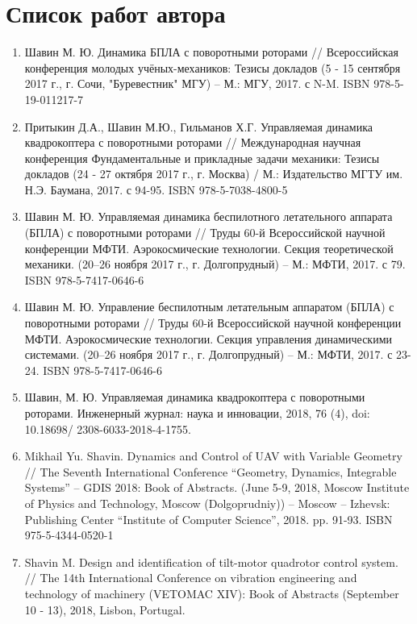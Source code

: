 \chapter{Список работ автора}
\label{list_chapter}
\begin{enumerate}
	\item Шавин М. Ю. Динамика БПЛА с поворотными роторами // Всероссийская конференция молодых учёных-механиков: Тезисы докладов (5 - 15 сентября 2017 г., г. Сочи, "Буревестник" МГУ)  – М.: МГУ, 2017. с N-M. ISBN 978-5-19-011217-7
	
	\item Притыкин Д.А., Шавин М.Ю., Гильманов Х.Г. Управляемая динамика квадрокоптера с поворотными роторами // Международная научная конференция Фундаментальные и прикладные задачи механики: Тезисы докладов (24 - 27 октября 2017 г., г. Москва) / М.: Издательство МГТУ им. Н.Э. Баумана, 2017. с 94-95.
	ISBN 978-5-7038-4800-5
	
	\item Шавин М. Ю. Управляемая динамика беспилотного летательного аппарата (БПЛА) с поворотными роторами // Труды 60-й Всероссийской научной конференции МФТИ. Аэрокосмические технологии. Секция теоретической механики. (20–26 ноября 2017 г., г. Долгопрудный) -- М.: МФТИ, 2017. с 79. ISBN 978-5-7417-0646-6
	
	\item Шавин М. Ю. Управление беспилотным летательным аппаратом (БПЛА) с поворотными роторами // Труды 60-й Всероссийской научной конференции МФТИ. Аэрокосмические технологии. Секция управления динамическими системами. (20–26 ноября 2017 г., г. Долгопрудный) -- М.: МФТИ, 2017. с 23-24. ISBN 978-5-7417-0646-6
	
	\item Шавин, М. Ю. Управляемая динамика квадрокоптера с поворотными роторами. Инженерный журнал: наука и инновации, 2018, 76 (4), doi: 10.18698/ 2308-6033-2018-4-1755.
	
	\item Mikhail Yu. Shavin. Dynamics and Control of UAV with Variable Geometry // The Seventh International Conference “Geometry, Dynamics, Integrable Systems” – GDIS 2018: Book of Abstracts. (June 5-9, 2018, Moscow Institute of Physics and Technology, Moscow (Dolgoprudniy)) – Moscow – Izhevsk: Publishing Center “Institute of Computer Science”, 2018. pp. 91-93. ISBN 975-5-4344-0520-1
	
	\item Shavin M. Design and identification of tilt-motor quadrotor control system. // The 14th International Conference on vibration engineering and technology of machinery (VETOMAC XIV): Book of Abstracts (September 10 - 13), 2018, Lisbon, Portugal.
	

\end{enumerate}
